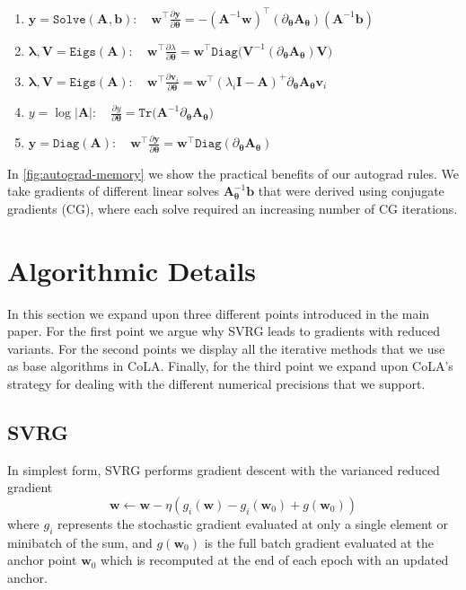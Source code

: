 \documentclass{article}
\newcommand{\mbf}[1]{{\boldsymbol{\mathbf{#1}}}}
\renewcommand{\bm}{\mbf}
\begin{document}
\begin{enumerate}
    \item
      $\bm{y}=\texttt{Solve}(\bm A_{\bm{}},\bm b): \quad
      \bm{w}^\intercal\tfrac{\partial \bm{y}}{\partial \bm \theta}
      =
      -(\bm{A}_{\bm{}}^{-1} \bm{w})^\intercal(\partial_{\bm{\theta}} \bm A_{\bm{\theta}})  (\bm{A}_{\bm{}}^{-1} \bm b)$
    \item
      $\bm \lambda, \bm V = \texttt{Eigs}(\bm A): \quad
      \bm{w}^\intercal\tfrac{\partial \lambda}{\partial \bm \theta}
      =
      \bm{w}^\intercal\texttt{Diag}\big(\bm V^{-1} (\partial_{\bm{\theta}} \bm A_{\bm{\theta}}) \bm V \big)
      $
    \item
      $\bm \lambda, \bm V = \texttt{Eigs}(\bm A): \quad
      \bm{w}^\intercal\tfrac{\partial \bm{v}_{i}}{\partial \bm \theta} =
      \bm{w}^{\intercal}(\lambda_{i} \bm{I} - \bm{A})^{+} \partial_{\bm{\theta}} \bm{A}_{\bm{\theta}} \bm{v}_{i}
      $
    \item
      $y = \log |\bm{A}|: \quad
      \frac{\partial y}{\partial \bm{\theta}}
      =
      \texttt{Tr} \big(\bm{A}^{-1} \partial_{\bm{\theta}} \bm{A}_{\bm{\theta}}\big)
      $
    \item
      $\bm y = \texttt{Diag}(\bm{A}): \quad
      \bm{w}^{\intercal} \frac{\partial \bm y}{\partial{\bm \theta}}
      =
      \bm{w}^{\intercal} \texttt{Diag}\left(\partial_{\bm{\theta}} \bm{A}_{\bm{\theta}}\right)
      $
\end{enumerate}

In \autoref{fig:autograd-memory} we show the practical benefits of our autograd rules.
We take gradients of different linear solves $\bm{A}_{\bm{\theta}}^{-1} \bm{b}$ that were derived using conjugate gradients (CG), where each solve required an increasing number of CG iterations.

\section{Algorithmic Details} \label{app:algorithms}
In this section we expand upon three different points introduced in the main paper.
For the first point we argue why SVRG leads to gradients with reduced variants.
For the second points we display all the iterative methods that we use as base algorithms in CoLA.
Finally, for the third point we expand upon CoLA's strategy for dealing with the different numerical precisions that we support.

\subsection{SVRG}
In simplest form, SVRG \citep{johnson2013accelerating} performs gradient descent with the varianced reduced gradient
\begin{equation}\label{eq:svrg_eq}
    \bm{w} \gets \bm{w} -  \eta(g_i(\bm{w})-g_i(\bm{w}_0)+g(\bm{w}_0))
\end{equation} where $g_i$ represents the stochastic gradient evaluated at only a single element or minibatch of the sum, and $g(\bm{w}_0)$ is the full batch gradient evaluated at the anchor point $\bm{w}_0$ which is recomputed at the end of each epoch with an updated anchor.
\end{document}
